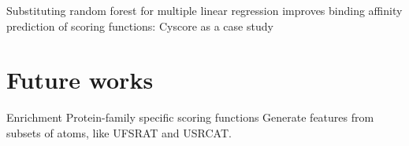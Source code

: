 \citep{1432} Substituting random forest for multiple linear regression improves binding affinity prediction of scoring functions: Cyscore as a case study

\section{Future works}

Enrichment
Protein-family specific scoring functions
Generate features from subsets of atoms, like UFSRAT and USRCAT.

\chapterend
